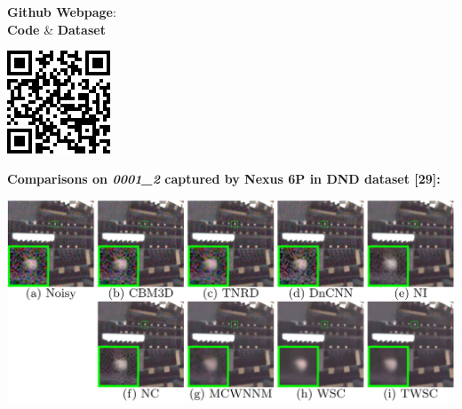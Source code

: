 \documentclass[landscape,fontscale=0.292,archE]{baposter}
\begin{document}
\begin{poster}
{\begin{minipage}[t]{0.44\textwidth}
        \begin{center}
        \begin{minipage}{0.55\linewidth}
            \begin{center}
            \textbf{Github Webpage}: \\
            \vspace{2mm}\textbf{Code} \& \textbf{Dataset}
            \end{center}
        \end{minipage}
        \begin{minipage}{0.4\linewidth}
            \begin{center}
                \includegraphics[width=\linewidth]{images/TWSC_QRCode.png}
            \end{center}
        \end{minipage}
        \end{center}
    \end{minipage}
      \hfill
    \begin{minipage}[t]{0.55\textwidth}
            \textbf{\color{blue}Comparisons on \textsl{0001\_2} captured by Nexus 6P in DND dataset [29]:} 
        \vspace{-1mm}
        \begin{center}
            \includegraphics[width=\textwidth]{images/realdnd}

\end{center}
\end{minipage}}
\end{poster}
\end{document}
